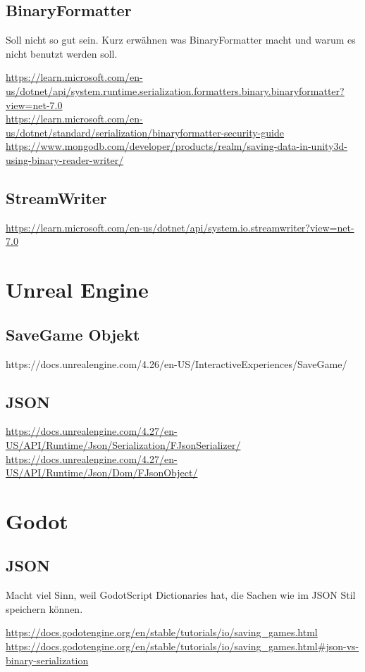 \subsection{BinaryFormatter}
Soll nicht so gut sein. Kurz erwähnen was BinaryFormatter macht und warum es nicht benutzt
werden soll.

\url{https://learn.microsoft.com/en-us/dotnet/api/system.runtime.serialization.formatters.binary.binaryformatter?view=net-7.0}\\
\url{https://learn.microsoft.com/en-us/dotnet/standard/serialization/binaryformatter-security-guide}\\
\url{https://www.mongodb.com/developer/products/realm/saving-data-in-unity3d-using-binary-reader-writer/}

\subsection{StreamWriter}
\url{https://learn.microsoft.com/en-us/dotnet/api/system.io.streamwriter?view=net-7.0}

\section{Unreal Engine}
\subsection{SaveGame Objekt}
https://docs.unrealengine.com/4.26/en-US/InteractiveExperiences/SaveGame/

\subsection{JSON}
\url{https://docs.unrealengine.com/4.27/en-US/API/Runtime/Json/Serialization/FJsonSerializer/}\\
\url{https://docs.unrealengine.com/4.27/en-US/API/Runtime/Json/Dom/FJsonObject/}

\section{Godot}

\subsection{JSON}
Macht viel Sinn, weil GodotScript Dictionaries hat, die Sachen wie im JSON Stil speichern 
können.

\url{https://docs.godotengine.org/en/stable/tutorials/io/saving_games.html}\\
\url{https://docs.godotengine.org/en/stable/tutorials/io/saving_games.html#json-vs-binary-serialization}